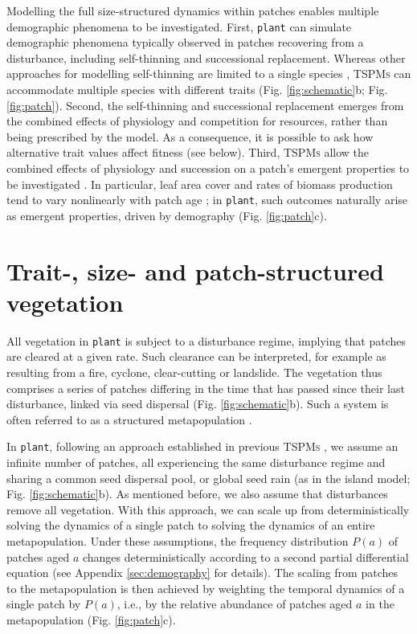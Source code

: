 \documentclass[a4paper,11pt]{article}
\newcommand{\plant}{\texttt{plant}}
\begin{document}
Modelling the full size-structured dynamics within patches enables multiple demographic phenomena to be
investigated. First, {\plant} can simulate demographic
phenomena typically observed in patches
recovering from a disturbance, including self-thinning and
successional replacement. Whereas other approaches for modelling
self-thinning are limited to a single species
\citep[e.g.,][]{Barnes-2004, Coomes-2007}, \textsc{TSPMs} can accommodate
multiple species with different traits (Fig. \ref{fig:schematic}b;
Fig. \ref{fig:patch}). Second, the self-thinning and
successional replacement emerges from the
combined effects of physiology and competition for resources, rather
than being prescribed by the model. As a consequence, it is possible to ask how alternative trait values affect fitness (see below). Third, \textsc{TSPMs} allow the combined effects of physiology and succession on a patch's emergent
properties to be investigated
\citep{Moorcroft-2001, Falster-2011}. In particular, leaf area cover and rates of biomass
production tend to vary nonlinearly with patch
age \citep{Smith-2001, Binkley-2002, Ogawa-2010};
in {\plant}, such outcomes naturally arise as emergent properties,
driven by demography (Fig. \ref{fig:patch}c).

\section{Trait-, size- and patch-structured vegetation}

All vegetation in {\plant} is subject to a disturbance regime, implying that patches
are cleared at a given rate. Such clearance can be interpreted, for example
as resulting from a fire, cyclone, clear-cutting or
landslide. The vegetation thus comprises a series of patches
differing in the time that has passed since their last disturbance, linked via seed dispersal
(Fig. \ref{fig:schematic}b). Such a system is often referred to as a
structured metapopulation \citep{Gyllenberg-2001}.

In {\plant}, following an approach established in previous \textsc{TSPMs}
\citep{Kohyama-1993, Moorcroft-2001, Falster-2011},
we assume an infinite number of patches, all experiencing
the same disturbance regime and sharing a common seed dispersal pool, or global seed rain
(as in the island model; Fig. \ref{fig:schematic}b). As mentioned before, we also assume
that disturbances remove all vegetation. With this
approach, we can scale up from deterministically solving the dynamics of
a single patch to solving the dynamics of an entire metapopulation.
Under these assumptions, the frequency distribution \(P(a)\) of patches aged
\(a\) changes deterministically according to a second partial differential equation (see Appendix
\ref{sec:demography} for details). The scaling from patches to the
metapopulation is then achieved by weighting the temporal dynamics of
a single patch by \(P(a)\), i.e., by the relative abundance of patches aged
\(a\) in the metapopulation (Fig. \ref{fig:patch}c).
\end{document}

